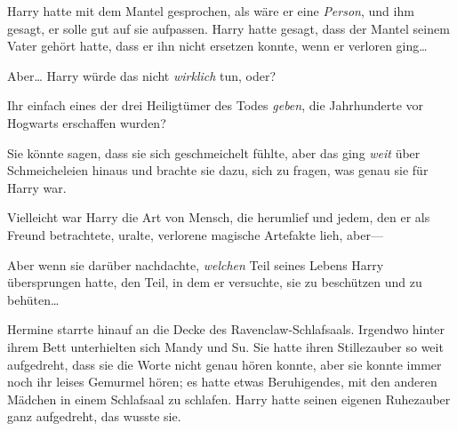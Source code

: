 Harry hatte mit dem Mantel gesprochen, als wäre er eine \emph{Person}, und ihm gesagt, er solle gut auf sie aufpassen. Harry hatte gesagt, dass der Mantel seinem Vater gehört hatte, dass er ihn nicht ersetzen konnte, wenn er verloren ging…

Aber… Harry würde das nicht \emph{wirklich} tun, oder?

Ihr einfach eines der drei Heiligtümer des Todes \emph{geben}, die Jahrhunderte vor Hogwarts erschaffen wurden?

Sie könnte sagen, dass sie sich geschmeichelt fühlte, aber das ging \emph{weit} über Schmeicheleien hinaus und brachte sie dazu, sich zu fragen, was genau sie für Harry war.

Vielleicht war Harry die Art von Mensch, die herumlief und jedem, den er als Freund betrachtete, uralte, verlorene magische Artefakte lieh, aber—

Aber wenn sie darüber nachdachte, \emph{welchen} Teil seines Lebens Harry übersprungen hatte, den Teil, in dem er versuchte, sie zu beschützen und zu behüten…

Hermine starrte hinauf an die Decke des Ravenclaw-Schlafsaals. Irgendwo hinter ihrem Bett unterhielten sich Mandy und Su. Sie hatte ihren Stillezauber so weit aufgedreht, dass sie die Worte nicht genau hören konnte, aber sie konnte immer noch ihr leises Gemurmel hören; es hatte etwas Beruhigendes, mit den anderen Mädchen in einem Schlafsaal zu schlafen. Harry hatte seinen eigenen Ruhezauber ganz aufgedreht, das wusste sie.

